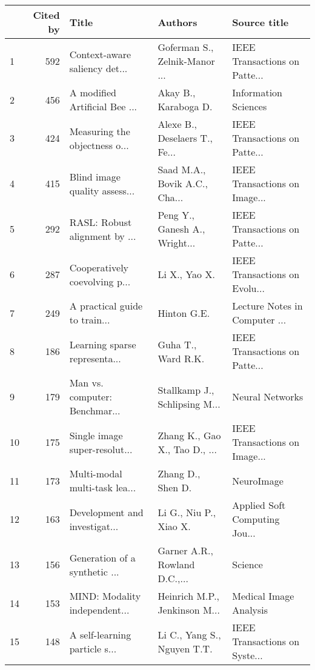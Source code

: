 \begin{tabular}{lrlll}
\toprule
{} &  Cited by &                          Title &                        Authors &                   Source title \\
\midrule
1  &       592 &  Context-aware saliency det... &  Goferman S., Zelnik-Manor ... &  IEEE Transactions on Patte... \\
2  &       456 &  A modified Artificial Bee ... &           Akay B., Karaboga D. &           Information Sciences \\
3  &       424 &  Measuring the objectness o... &  Alexe B., Deselaers T., Fe... &  IEEE Transactions on Patte... \\
4  &       415 &  Blind image quality assess... &  Saad M.A., Bovik A.C., Cha... &  IEEE Transactions on Image... \\
5  &       292 &  RASL: Robust alignment by ... &  Peng Y., Ganesh A., Wright... &  IEEE Transactions on Patte... \\
6  &       287 &  Cooperatively coevolving p... &                  Li X., Yao X. &  IEEE Transactions on Evolu... \\
7  &       249 &  A practical guide to train... &                    Hinton G.E. &  Lecture Notes in Computer ... \\
8  &       186 &  Learning sparse representa... &             Guha T., Ward R.K. &  IEEE Transactions on Patte... \\
9  &       179 &  Man vs. computer: Benchmar... &  Stallkamp J., Schlipsing M... &                Neural Networks \\
10 &       175 &  Single image super-resolut... &  Zhang K., Gao X., Tao D., ... &  IEEE Transactions on Image... \\
11 &       173 &  Multi-modal multi-task lea... &              Zhang D., Shen D. &                     NeuroImage \\
12 &       163 &  Development and investigat... &         Li G., Niu P., Xiao X. &  Applied Soft Computing Jou... \\
13 &       156 &  Generation of a synthetic ... &  Garner A.R., Rowland D.C.,... &                        Science \\
14 &       153 &  MIND: Modality independent... &  Heinrich M.P., Jenkinson M... &         Medical Image Analysis \\
15 &       148 &  A self-learning particle s... &    Li C., Yang S., Nguyen T.T. &  IEEE Transactions on Syste... \\
\bottomrule
\end{tabular}
